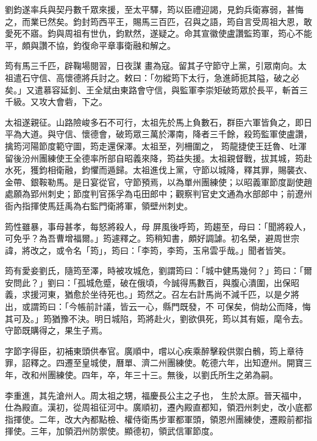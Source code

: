 \begin{pinyinscope}
 劉鈞遂率兵與契丹數千眾來援，至太平驛，筠以臣禮迎謁，見鈞兵衛寡弱，甚悔之，而業已然矣。鈞封筠西平王，賜馬三百匹，召與之語，筠自言受周祖大恩，敢愛死不寤。鈞與周祖有世仇，鈞默然，遂疑之。命其宣徽使盧讚監筠軍，筠心不能平，頗與讚不協，鈞復命平章事衛融和解之。



 筠有馬三千匹，辟鞠場閱習，日夜謀
 畫為寇。留其子守節守上黨，引眾南向。太祖遣石守信、高懷德將兵討之。敕曰：「勿縱筠下太行，急進師扼其隘，破之必矣。」又遣慕容延釗、王全斌由東路會守信，與監軍李崇矩破筠眾於長平，斬首三千級。又攻大會砦，下之。



 太祖遂親征。山路險峻多石不可行，太祖先於馬上負數石，群臣六軍皆負之，即日平為大道。與守信、懷德會，破筠眾三萬於澤南，降者三千餘，殺筠監軍使盧讚，擒筠河陽節度範守圖，筠走還保澤。太祖至，列柵圍之，
 筠龍捷使王廷魯、吐渾留後汾州團練使王全德率所部自昭義來降，筠益失援。太祖親督戰，拔其城，筠赴水死，獲鈞相衛融，鈞懼而遁歸。太祖進伐上黨，守節以城降，釋其罪，賜襲衣、金帶、銀鞍勒馬。是日宴從官，守節預焉，以為單州團練使；以昭義軍節度副使趙處願為郢州刺史；節度判官孫孚為屯田郎中；觀察判官史文通為水部郎中；前遼州衙內指揮使馬廷禹為右監門衛將軍，領壁州刺史。



 筠性雖暴，事母甚孝，每怒將殺人，母
 屏風後呼筠，筠趨至，母曰：「聞將殺人，可免乎？為吾曹增福爾。」筠遽釋之。筠稍知書，頗好調謔。初名榮，避周世宗諱，將改之，或令名「筠」，筠曰：「李筠，李筠，玉帛雲乎哉。」聞者皆笑。



 筠有愛妾劉氏，隨筠至澤，時被攻城危，劉謂筠曰：「城中健馬幾何？」筠曰：「爾安問此？」劉曰：「孤城危蹙，破在俄頃，今誠得馬數百，與腹心潰圍，出保昭義，求援河東，猶愈於坐待死也。」筠然之。召左右計馬尚不減千匹，以是夕將出，或謂筠曰：「今帳前計議，皆云一心，縣門既發，不
 可保矣，倘劫公而降，悔其可及。」筠猶豫不決。明日城陷，筠將赴火，劉欲俱死，筠以其有娠，麾令去。守節既購得之，果生子焉。



 字節字得臣，初補東頭供奉官。廣順中，嚐以心疾乘醉擊殺供禦白鶻，筠上章待罪，詔釋之。四遷至皇城使，曆單、濟二州團練使。乾德六年，出知遼州。開寶三年，改和州團練使。四年，卒，年三十三。無後，以劉氏所生之弟為嗣。



 李重進，其先滄州人。周太祖之甥，福慶長公主之子也，
 生於太原。晉天福中，仕為殿直。漢初，從周祖征河中。廣順初，遷內殿直都知，領泗州刺史，改小底都指揮使。二年，改大內都點檢、權侍衛馬步軍都軍頭，領恩州團練使，遷殿前都指揮使。三年，加領泗州防禦使。顯德初，領武信軍節度。




\end{pinyinscope}
